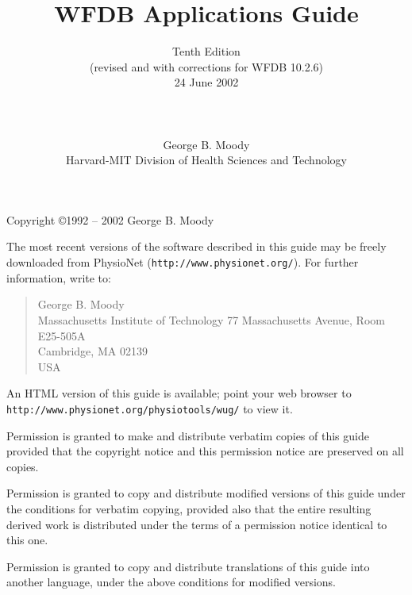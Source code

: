 \documentclass[twoside]{book}
\title{WFDB Applications Guide}
\author{Tenth Edition\\
(revised and with corrections for WFDB 10.2.6)\\
24 June 2002\\
\\
\\
\\
George B. Moody\\
Harvard-MIT Division of Health Sciences and Technology}
\date{}
\begin{document}
\maketitle

\pagestyle{empty}
\vspace*{\fill}
\noindent
Copyright \copyright 1992 -- 2002 George B. Moody

\vspace{1 in}
\noindent
The most recent versions of the software described in this guide may be
freely downloaded from PhysioNet ({\tt http://www.physionet.org/}).
For further information, write to:

\begin{quote}
George B. Moody\\
Massachusetts Institute of Technology
77 Massachusetts Avenue, Room E25-505A\\
Cambridge, MA 02139\\
USA\\
\end{quote}

\noindent
An HTML version of this guide is available; point your web browser to
{\tt http://www.\-physio\-net.\-org/\-physio\-tools/\-wug/} to view it.

\vspace{0.2 in}
\noindent
Permission is granted to make and distribute verbatim copies of this
guide provided that the copyright notice and this permission notice are
preserved on all copies.

\vspace{0.2 in}
\noindent
Permission is granted to copy and distribute modified versions of this
guide under the conditions for verbatim copying, provided also that the
entire resulting derived work is distributed under the terms of a
permission notice identical to this one.

\vspace{0.2 in}
\noindent
Permission is granted to copy and distribute translations of this guide
into another language, under the above conditions for modified versions.
\end{document}
